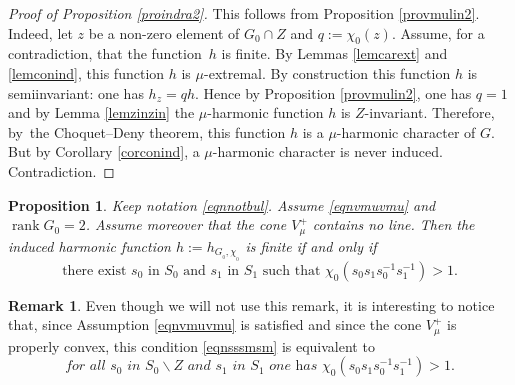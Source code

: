 \documentclass[11pt]{article}
\numberwithin{equation}{section}
\DeclareMathOperator{\rank}{rank}
\newtheorem{Prop}[Thm]{Proposition}
\theoremstyle{definition}
\newtheorem{Rem}[Thm]{Remark}
\begin{document}
\begin{proof}[Proof of Proposition \ref{proindra2}]
This follows from Proposition \ref{provmulin2}.
Indeed, let $z$ be a non-zero element of $G_0\cap Z$ and $q:=\chi_0(z)$.
Assume, for a contradiction, that the function~$h$ is finite.
By Lemmas \ref{lemcarext} and \ref{lemconind},
this function $h$ is $\mu$-extremal.
By construction this function $h$ is semiinvariant: one has
$h_z=qh$. Hence by Proposition \ref{provmulin2}, one has $q=1$
and by Lemma \ref{lemzinzin} the $\mu$-harmonic function $h$ is $Z$-invariant.
Therefore, by~the Choquet--Deny theorem, this function $h$
is a $\mu$-harmonic character of $G$.
But by Corollary \ref{corconind}, a $\mu$-harmonic character is never induced.
Contradiction.
\end{proof}

\begin{Prop}

\label{proindra3}
Keep notation \eqref{eqnnotbul}. Assume \eqref{eqnvmuvmu} and $\rank G_0=2$.
Assume moreover that the cone $V^+_\mu$ contains no line.
Then the induced harmonic function $h:=h_{G_{_0},\chi_{_0}}$ is finite if and only if
\begin{equation}
\label{eqnsssmsm}
\text{there exist $s_0$ in $S_0$ and $s_1$ in $S_1$ such that $\chi_0(s_0s_1s_0^{-1}s_1^{-1})>1$.}
\end{equation}
\end{Prop}

\begin{Rem} Even though we will not use this remark, it is interesting to notice
that, since Assumption \eqref{eqnvmuvmu} is satisfied and since
the cone $V^+_\mu$ is properly convex,
this condition \eqref{eqnsssmsm} is equivalent to\vspace*{-3pt}
\begin{equation}
\label{eqnsssmsm2}
\textit{for all $s_0$ in $S_0\smallsetminus Z$ and $s_1$ in $S_1$ one has $\chi_0(s_0s_1s_0^{-1}s_1^{-1})>1$.}
\end{equation}
\end{Rem}
\end{document}
